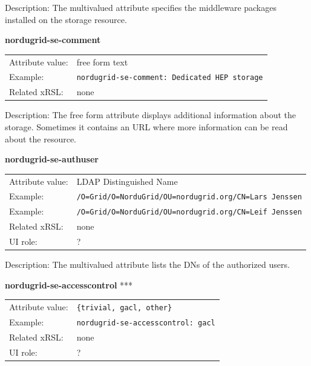\documentclass{article}
\begin{document}
Description: The multivalued attribute specifies the middleware packages 
installed on the storage resource. 


  \hspace*{0.5cm}
  \begin{shaded}
    \textbf{nordugrid-se-comment}
  \end{shaded}
  \begin{tabular}{lp{10cm}}  
    Attribute value:& free form text\\
    Example:& \verb#nordugrid-se-comment: Dedicated HEP storage#\\
    Related xRSL:& none\\
  \end{tabular}

Description: The free form attribute displays additional information about 
the storage. Sometimes it contains an URL where more information can be read
about the resource.


  \hspace*{0.5cm}
  \begin{shaded}
    \textbf{nordugrid-se-authuser}
  \end{shaded}
  \begin{tabular}{lp{10cm}}  
    Attribute value:&  LDAP Distinguished Name\\
    Example:& \verb#/O=Grid/O=NorduGrid/OU=nordugrid.org/CN=Lars Jenssen#\\
    Example:& \verb#/O=Grid/O=NorduGrid/OU=nordugrid.org/CN=Leif Jenssen#\\
    Related xRSL:& none\\
    UI role:& ?\\
  \end{tabular}

Description: The multivalued attribute lists the DNs of the authorized users.



  \hspace*{0.5cm}
  \begin{shaded}
    \textbf{nordugrid-se-accesscontrol} ***
  \end{shaded}
  \begin{tabular}{lp{10cm}}  
    Attribute value:& \verb#{trivial, gacl, other}#\\
    Example:& \verb#nordugrid-se-accesscontrol: gacl#\\
    Related xRSL:& none\\
    UI role:& ? \\
  \end{tabular}
\end{document}

